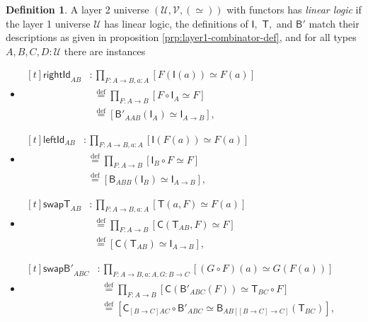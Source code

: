 \documentclass[a4paper]{article}
\theoremstyle{definition}
\newtheorem{definition}{Definition}[section]
\theoremstyle{remark}
\newcommand{\defn}{\emph}
\newcommand{\eqDef}{\overset{\text{def}}{=}}
\renewcommand{\equiv}{\simeq}
\newcommand{\U}{\mathcal{U}}
\newcommand{\V}{\mathcal{V}}
\newcommand{\nm}{\mathsf}
\newcommand{\combinator}{\nm}
\newcommand{\idFun}{\combinator{I}}
\newcommand{\revAppFun}{\combinator{T}}
\newcommand{\compFun}{\combinator{B'}}
\newcommand{\revCompFun}{\combinator{B}}
\newcommand{\swapFun}{\combinator{C}}
\newcommand{\rightId}{\nm{rightId}}
\newcommand{\leftId}{\nm{leftId}}
\newcommand{\swapRevApp}{\nm{swapT}}
\newcommand{\swapCompFun}{\nm{swapB'}}
\begin{document}
\begin{definition}
  \label{def:layer2-dependent-combinators}
  A layer 2 universe $(\U,\V,(\equiv))$ with functors has \defn{linear logic} if the layer 1
  universe $\U$ has linear logic, the definitions of $\idFun,$ $\revAppFun,$ and $\compFun$ match
  their descriptions as given in proposition \ref{prp:layer1-combinator-def}, and for all types
  $A,B,C,D : \U$ there are instances
  \begin{itemize}
    \item $\begin{aligned}[t]
      \rightId_{AB} &: \prod_{F : A \to B, a : A} [F(\idFun(a)) \equiv F(a)]\\
                    &\ \ \eqDef \prod_{F : A \to B} [F \circ \idFun_A \equiv F]\\
                    &\ \ \eqDef [\compFun_{AAB}(\idFun_A) \equiv \idFun_{A{\to}B}],
    \end{aligned}$
    \item $\begin{aligned}[t]
      \leftId_{AB} &: \prod_{F : A \to B, a : A} [\idFun(F(a)) \equiv F(a)]\\
                   &\ \ \eqDef \prod_{F : A \to B} [\idFun_B \circ F \equiv F]\\
                   &\ \ \eqDef [\revCompFun_{ABB}(\idFun_B) \equiv \idFun_{A{\to}B}],
    \end{aligned}$
    \item $\begin{aligned}[t]
      \swapRevApp_{AB} &: \prod_{F : A \to B, a : A} [\revAppFun(a,F) \equiv F(a)]\\
                       &\ \ \eqDef \prod_{F : A \to B} [\swapFun(\revAppFun_{AB},F) \equiv F]\\
                       &\ \ \eqDef [\swapFun(\revAppFun_{AB}) \equiv \idFun_{A{\to}B}],
    \end{aligned}$
    \item $\begin{aligned}[t]
      \swapCompFun_{ABC} &: \prod_{F : A \to B, a : A, G : B \to C} [(G \circ F)(a) \equiv G(F(a))]\\
                         &\ \ \eqDef \prod_{F : A \to B} [\swapFun(\compFun_{ABC}(F)) \equiv \revAppFun_{BC} \circ F]\\
                         &\ \ \eqDef [\swapFun_{[B{\to}C]AC} \circ \compFun_{ABC} \equiv \revCompFun_{AB[[B{\to}C]{\to}C]}(\revAppFun_{BC})],
    \end{aligned}$

\end{itemize}
\end{definition}
\end{document}

